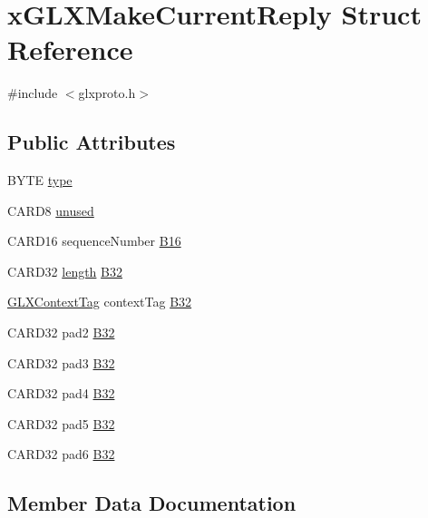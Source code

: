 \hypertarget{structx_g_l_x_make_current_reply}{}\section{x\+G\+L\+X\+Make\+Current\+Reply Struct Reference}
\label{structx_g_l_x_make_current_reply}


{\ttfamily \#include $<$glxproto.\+h$>$}

\subsection*{Public Attributes}
\begin{DoxyCompactItemize}
\item 
B\+Y\+TE \hyperlink{structx_g_l_x_make_current_reply_ac1f344a19f1982bf3838a7542b4d1adf}{type}
\item 
C\+A\+R\+D8 \hyperlink{structx_g_l_x_make_current_reply_ab432487b29a37e43179689b9c8ca0eaa}{unused}
\item 
C\+A\+R\+D16 sequence\+Number \hyperlink{structx_g_l_x_make_current_reply_a77d1757ab5a45a9dab8cb265d9a07370}{B16}
\item 
C\+A\+R\+D32 \hyperlink{glcorearb_8h_ab9c919755bde3b34349e23a32b4e0fa7}{length} \hyperlink{structx_g_l_x_make_current_reply_a22894515186b1d51ffb908241f29e872}{B32}
\item 
\hyperlink{glxproto_8h_ae71763ce00c9fa460beb4699af678691}{G\+L\+X\+Context\+Tag} context\+Tag \hyperlink{structx_g_l_x_make_current_reply_ac30a3ce65547f0e87568bfc45fd123da}{B32}
\item 
C\+A\+R\+D32 pad2 \hyperlink{structx_g_l_x_make_current_reply_a7b5cdb0751799df1ce61c5524d96729b}{B32}
\item 
C\+A\+R\+D32 pad3 \hyperlink{structx_g_l_x_make_current_reply_a9a63ad2890e1e730331e6595faddcf53}{B32}
\item 
C\+A\+R\+D32 pad4 \hyperlink{structx_g_l_x_make_current_reply_a8c1899030b58dfc86db273263e1edd95}{B32}
\item 
C\+A\+R\+D32 pad5 \hyperlink{structx_g_l_x_make_current_reply_a48cd4386a7fd8a8c2522e9e0f593fb55}{B32}
\item 
C\+A\+R\+D32 pad6 \hyperlink{structx_g_l_x_make_current_reply_a29e61a7bcf7d12939ea1ae4933b76a1d}{B32}
\end{DoxyCompactItemize}


\subsection{Member Data Documentation}
\mbox{\label{structx_g_l_x_make_current_reply_a77d1757ab5a45a9dab8cb265d9a07370}} 
